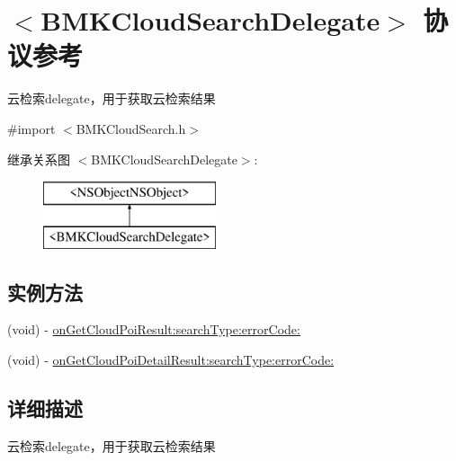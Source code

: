 \hypertarget{protocol_b_m_k_cloud_search_delegate-p}{\section{$<$B\-M\-K\-Cloud\-Search\-Delegate$>$ 协议参考}
\label{protocol_b_m_k_cloud_search_delegate-p}
}


云检索delegate，用于获取云检索结果  




{\ttfamily \#import $<$B\-M\-K\-Cloud\-Search.\-h$>$}

继承关系图 $<$B\-M\-K\-Cloud\-Search\-Delegate$>$\-:\begin{figure}[H]
\begin{center}
\leavevmode
\includegraphics[height=2.000000cm]{protocol_b_m_k_cloud_search_delegate-p}
\end{center}
\end{figure}
\subsection*{实例方法}
\begin{DoxyCompactItemize}
\item 
(void) -\/ \hyperlink{protocol_b_m_k_cloud_search_delegate-p_aadc90dad37954d8527d4aca657c802f4}{on\-Get\-Cloud\-Poi\-Result\-:search\-Type\-:error\-Code\-:}
\item 
(void) -\/ \hyperlink{protocol_b_m_k_cloud_search_delegate-p_a5abcb777d4533baa036beb635268b60d}{on\-Get\-Cloud\-Poi\-Detail\-Result\-:search\-Type\-:error\-Code\-:}
\end{DoxyCompactItemize}


\subsection{详细描述}
云检索delegate，用于获取云检索结果 

